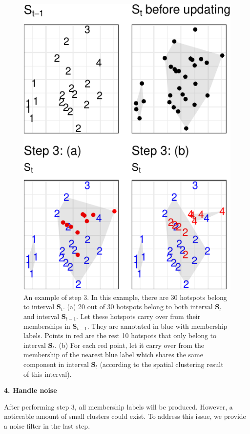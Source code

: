 \begin{Schunk}
\begin{figure}

{\centering \includegraphics[width=0.8\linewidth]{clustering_paper_files/figure-latex/step3figs-1} 

}

\caption{An example of step 3. In this example, there are 30 hotspots belong to interval $\boldsymbol{S}_t$. (a) 20 out of 30 hotspots belong to both interval $\boldsymbol{S}_t$ and interval $\boldsymbol{S}_{t-1}$. Let these hotspots carry over from their memberships in $\boldsymbol{S}_{t-1}$. They are annotated in blue with membership labels. Points in red are the rest 10 hotspots that only belong to interval $\boldsymbol{S}_t$. (b) For each red point, let it carry over from the membership of the nearest blue label which shares the same component in interval $\boldsymbol{S}_t$ (according to the spatial clustering result of this interval). }\label{fig:step3figs}
\end{figure}
\end{Schunk}

\textbf{4. Handle noise}

After performing step 3, all membership labels will be produced.
However, a noticeable amount of small clusters could exist. To address
this issue, we provide a noise filter in the last step.

